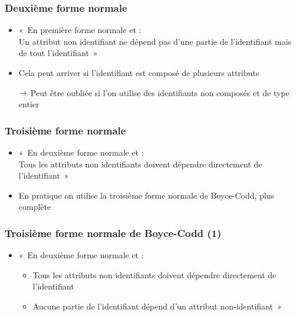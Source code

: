 \begin{frame}
  \frametitle{Deuxième forme normale}
  \begin{itemize}
    \item «~En première forme normale et :\\
        Un attribut non identifiant ne dépend pas d’une partie de l'identifiant
        mais de tout l'identifiant~»
    \item Cela peut arriver si l'identifiant est composé de plusieurs attributs
    \item[$\rightarrow$] Peut être oubliée si l'on utilise des identifiants non composés et de type entier
  \end{itemize}
\end{frame}

\begin{frame}
  \frametitle{Troisième forme normale}
  \begin{itemize}
    \item «~En deuxième forme normale et :\\
        Tous les attributs non identifiants doivent dépendre directement de
        l'identifiant~»
    \item En pratique on utilise la troisième forme normale de Boyce-Codd, plus complète
  \end{itemize}
\end{frame}

\begin{frame}
  \frametitle{Troisième forme normale de Boyce-Codd (1)}
  \begin{itemize}
    \item «~En deuxième forme normale et :
        \begin{itemize}
            \item Tous les attributs non identifiants doivent dépendre directement de l'identifiant
            \item Aucune partie de l'identifiant dépend d'un attribut
                non-identifiant~»
        \end{itemize}
  \end{itemize}
\end{frame}

